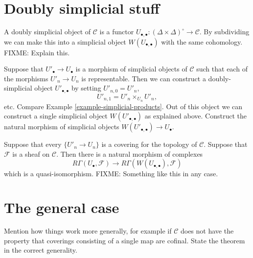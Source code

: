 \section{Doubly simplicial stuff}
\label{section-doubly-simplicial}

\noindent
A doubly simplicial object of $\mathcal{C}$ is a functor
$U_{\bullet,\bullet} : (\Delta\times\Delta)^\circ \to \mathcal{C}$.
By subdividing we can make this into a simplicial object 
$W(U_{\bullet,\bullet})$ with the same cohomology. FIXME: Explain this.

\noindent
Suppose that $U'_\bullet \to U_\bullet$ is a morphism of simplicial
objects of $\mathcal{C}$ such that each of the morphisms $U'_n \to
U_n$ is representable. Then we can construct a doubly-simplicial
object $U'_{\bullet,\bullet}$ by setting $U'_{n,0}= U'_n$,
$$
U'_{n,1} = U'_n \times_{U_n} U'_n,
$$
etc. Compare Example \ref{example-simplicial-products}. 
Out of this object we can construct a single simplicial object
$W(U'_{\bullet,\bullet})$ as explained above. Construct the 
natural morphism of simplicial objects 
$W(U'_{\bullet,\bullet}) \to U_\bullet$.

\begin{lemma}
Suppose that every $\{U'_n \to U_n\}$ is a covering for the topology
of $\mathcal{C}$. Suppose that $\mathcal{F}$ is a sheaf on 
$\mathcal{C}$. Then there is a natural
morphism of complexes
$$
R\Gamma(U_\bullet, \mathcal{F}) \to 
R\Gamma(W(U_{\bullet,\bullet}), \mathcal{F})
$$
which is a quasi-isomorphism. FIXME: Something like this in any case.
\end{lemma}

\section{The general case}

\noindent
Mention how things work more generally, for example if $\mathcal{C}$
does not have the property that coverings consisting of a single map
are cofinal. State the theorem in the correct generality.







